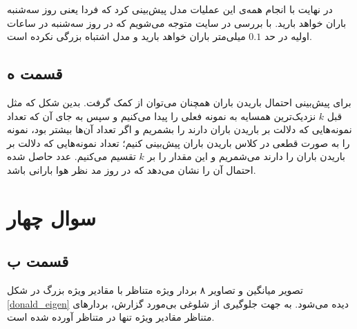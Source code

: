 \documentclass{article}
\begin{document}
در نهایت با انجام همه‌ی این عملیات مدل پیش‌بینی کرد که فردا یعنی روز سه‌شنبه باران خواهد بارید. با
بررسی در سایت متوجه می‌شویم که در روز سه‌شنبه در ساعات اولیه در حد $0.1$ میلی‌متر باران خواهد بارید و
مدل اشتباه بزرگی نکرده است.

\subsection*{قسمت ه}

برای پیش‌بینی احتمال باریدن باران همچنان می‌توان از  کمک گرفت. بدین شکل که
مثل قبل $k$ نزدیک‌ترین همسایه به نمونه فعلی را پیدا می‌کنیم و سپس به جای آن که
تعداد نمونه‌هایی که دلالت بر باریدن باران دارند را بشمریم و اگر تعداد آن‌ها
بیشتر بود، نمونه را به صورت قطعی در کلاس باریدن باران پیش‌بینی کنیم؛ تعداد نمونه‌هایی که دلالت
بر باریدن باران را دارند می‌شمریم و این مقدار را بر $k$ تقسیم می‌کنیم. عدد حاصل شده احتمال آن را
نشان می‌دهد که در روز مد نظر هوا بارانی باشد.

\section*{سوال چهار}

\subsection*{قسمت ب}

تصویر میانگین و تصاویر ۸ بردار ویژه متناظر با مقادیر ویژه بزرگ در شکل \ref{donald_eigen} دیده می‌شود.
به جهت جلوگیری از شلوغی بی‌مورد گزارش، بردار‌های متناظر مقادیر ویژه تنها در  متناظر
آورده شده است.
\end{document}
